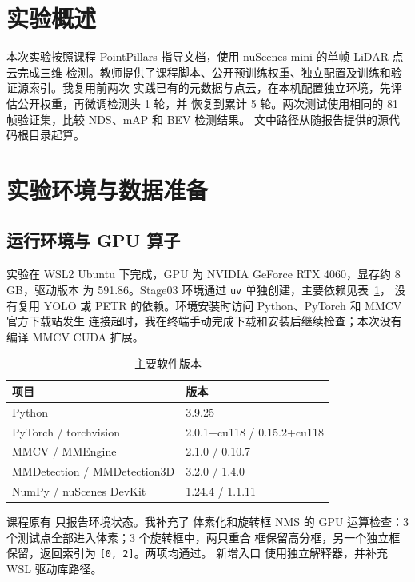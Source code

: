 \documentclass[UTF8,zihao=5,scheme=chinese]{ctexart}
\begin{document}
\hypersetup{pageanchor=false}
\makecoursecover
\hypersetup{pageanchor=true}
\tableofcontents
\clearpage

\section{实验概述}

本次实验按照课程 PointPillars 指导文档，使用 nuScenes mini 的单帧 LiDAR 点云完成三维
检测。教师提供了课程脚本、公开预训练权重、独立配置及训练和验证源索引。我复用前两次
实践已有的元数据与点云，在本机配置独立环境，先评估公开权重，再微调检测头 1 轮，并
恢复到累计 5 轮。两次测试使用相同的 81 帧验证集，比较 NDS、mAP 和 BEV 检测结果。
文中路径从随报告提供的源代码根目录起算。

\section{实验环境与数据准备}

\subsection{运行环境与 GPU 算子}

实验在 WSL2 Ubuntu 下完成，GPU 为 NVIDIA GeForce RTX 4060，显存约 8 GB，驱动版本
为 591.86。Stage03 环境通过 \texttt{uv} 单独创建，主要依赖见表~\ref{tab:environment}，
没有复用 YOLO 或 PETR 的依赖。环境安装时访问 Python、PyTorch 和 MMCV 官方下载站发生
连接超时，我在终端手动完成下载和安装后继续检查；本次没有编译 MMCV CUDA 扩展。

\begin{table}[htbp]
  \centering
  \caption{主要软件版本}
  \label{tab:environment}
  \begin{tabular}{ll}
    \toprule
    项目 & 版本 \\
    \midrule
    Python & 3.9.25 \\
    PyTorch / torchvision & 2.0.1+cu118 / 0.15.2+cu118 \\
    MMCV / MMEngine & 2.1.0 / 0.10.7 \\
    MMDetection / MMDetection3D & 3.2.0 / 1.4.0 \\
    NumPy / nuScenes DevKit & 1.24.4 / 1.1.11 \\
    \bottomrule
  \end{tabular}
\end{table}

课程原有  只报告环境状态。我补充了
体素化和旋转框 NMS 的 GPU 运算检查：3 个测试点全部进入体素；3 个旋转框中，两只重合
框保留高分框，另一个独立框保留，返回索引为 \texttt{[0, 2]}。两项均通过。
新增入口  使用独立解释器，并补充 WSL 驱动库路径。
\end{document}
